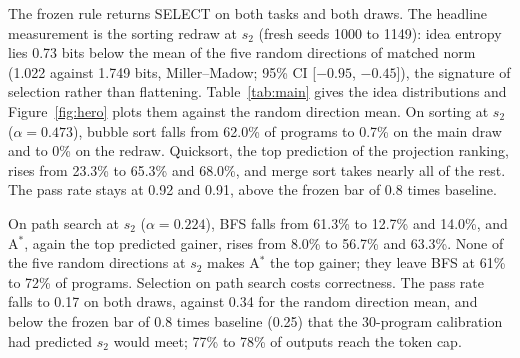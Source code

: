 \documentclass[11pt,letterpaper]{article}
\newcommand{\Astar}{A$^{*}$}
\begin{document}
The frozen rule returns SELECT on both tasks and both draws. The headline measurement is the sorting redraw at $s_2$ (fresh seeds 1000 to 1149): idea entropy lies 0.73 bits below the mean of the five random directions of matched norm (1.022 against 1.749 bits, Miller--Madow; 95\% CI [$-0.95$, $-0.45$]), the signature of selection rather than flattening. Table~\ref{tab:main} gives the idea distributions and Figure~\ref{fig:hero} plots them against the random direction mean. On sorting at $s_2$ ($\alpha = 0.473$), bubble sort falls from 62.0\% of programs to 0.7\% on the main draw and to 0\% on the redraw. Quicksort, the top prediction of the projection ranking, rises from 23.3\% to 65.3\% and 68.0\%, and merge sort takes nearly all of the rest. The pass rate stays at 0.92 and 0.91, above the frozen bar of 0.8 times baseline.

On path search at $s_2$ ($\alpha = 0.224$), BFS falls from 61.3\% to 12.7\% and 14.0\%, and \Astar{}, again the top predicted gainer, rises from 8.0\% to 56.7\% and 63.3\%. None of the five random directions at $s_2$ makes \Astar{} the top gainer; they leave BFS at 61\% to 72\% of programs. Selection on path search costs correctness. The pass rate falls to 0.17 on both draws, against 0.34 for the random direction mean, and below the frozen bar of 0.8 times baseline (0.25) that the 30-program calibration had predicted $s_2$ would meet; 77\% to 78\% of outputs reach the token cap.
\end{document}

